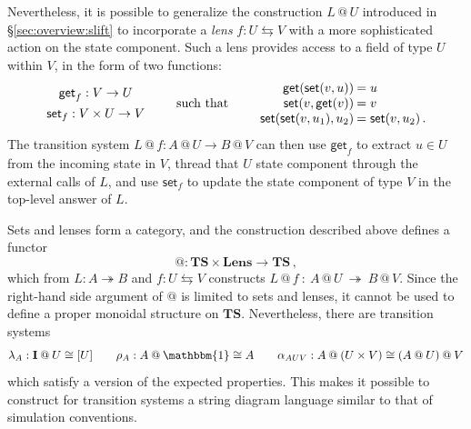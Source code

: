 \documentclass[acmsmall,screen,review,anonymous]{acmart}
\newcommand{\kw}[1]{\ensuremath{ \mathsf{#1} }}
\newcommand{\lensarrow}{\leftrightarrows}
\begin{document}
Nevertheless,
it is possible to generalize the construction $L \mathbin@ U$
introduced in \S\ref{sec:overview:slift}
to incorporate a \emph{lens} $f : U \lensarrow V$
with a more sophisticated action on the state component.
Such a lens provides access to a field of type $U$ within $V$,
in the form of two functions:
\[
  \begin{array}{c}
    \kw{get}_f : V \rightarrow U \\[1ex]
    \kw{set}_f : V \times U \rightarrow V
  \end{array}
  \qquad
  \text{such that}
  \qquad
  \begin{array}{r@{\:}l}
    \kw{get}(\kw{set}(v, u)) &= u \\
    \kw{set}(v, \kw{get}(v)) &= v \\
    \kw{set}(\kw{set}(v, u_1), u_2) &= \kw{set}(v, u_2)
    \,.
  \end{array}
\]
The transition system
$L \mathbin@ f : A \mathbin@ U \rightarrow B \mathbin@ V$
can then use $\kw{get}_f$ to extract $u \in U$ from the incoming state in $V$,
thread that $U$ state component through the external calls of $L$,
and use $\kw{set}_f$ to update the state component of type $V$
in the top-level answer of $L$.

Sets and lenses form a category,
and the construction described above defines a functor
\[
  \mathbin@ : \mathbf{TS} \times \mathbf{Lens}
    \rightarrow \mathbf{TS}
  \,,
\]
which from $L : A \twoheadrightarrow B$
and $f : U \lensarrow V$
constructs
$
  L \mathbin@ f \::\: A \mathbin@ U \:\twoheadrightarrow\: B \mathbin@ V
$.
Since the right-hand side argument of $\mathbin@$
is limited to sets and lenses,
it cannot be used to define a proper monoidal structure on $\mathbf{TS}$.
Nevertheless, there are transition systems
\[
  \lambda_A : \mathbf{I} \mathbin@ U \cong [U]
  \qquad
  \rho_A : A \mathbin@ \mathbbm{1} \cong A
  \qquad
  \alpha_{AUV} : A \mathbin@ (U \times V) \cong
    (A \mathbin@ U) \mathbin@ V
\]
which satisfy a version of the expected properties.
This makes it possible to construct for transition systems
a string diagram language
similar to that of simulation conventions.
\end{document}
